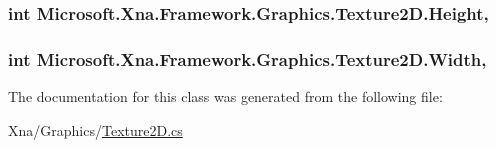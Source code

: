 \subsubsection[{Height}]{\setlength{\rightskip}{0pt plus 5cm}int Microsoft.\+Xna.\+Framework.\+Graphics.\+Texture2\+D.\+Height\hspace{0.3cm}{\ttfamily [get]}, {\ttfamily [set]}}\label{class_microsoft_1_1_xna_1_1_framework_1_1_graphics_1_1_texture2_d_a631bcbd93b1214049a222d3b646a0d2f}
\hypertarget{class_microsoft_1_1_xna_1_1_framework_1_1_graphics_1_1_texture2_d_a43c7679f1d7ad02dfdf4b33f6bc27769}{}
\subsubsection[{Width}]{\setlength{\rightskip}{0pt plus 5cm}int Microsoft.\+Xna.\+Framework.\+Graphics.\+Texture2\+D.\+Width\hspace{0.3cm}{\ttfamily [get]}, {\ttfamily [set]}}\label{class_microsoft_1_1_xna_1_1_framework_1_1_graphics_1_1_texture2_d_a43c7679f1d7ad02dfdf4b33f6bc27769}


The documentation for this class was generated from the following file\+:\begin{DoxyCompactItemize}
\item 
Xna/\+Graphics/\hyperlink{_texture2_d_8cs}{Texture2\+D.\+cs}\end{DoxyCompactItemize}

